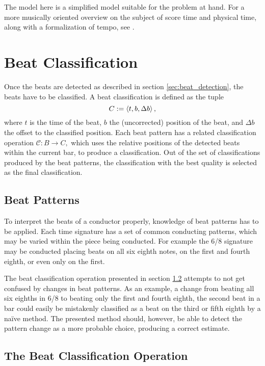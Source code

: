The model here is a simplified model
suitable for the problem at hand.
For a more musically oriented overview
on the subject of score time and physical time,
along with a formalization of tempo,
see \cite{Mazzola2011}.


\section{Beat Classification}

Once the beats are detected as described
in section \ref{sec:beat_detection},
the beats have to be classified.
A beat classification is defined as the tuple
\[
C := \left \langle t, b, \Delta b \right \rangle ,
\]
where $t$ is the time of the beat,
$b$ the (uncorrected) position of the beat,
and $\Delta b$ the offset to the classified position.
Each beat pattern has a related
classification operation $ \mathcal{C} : B \rightarrow C, $
which uses the relative positions of the detected beats
within the current bar,
to produce a classification.
Out of the set of classifications produced by the beat patterns,
the classification with the best quality is
selected as the final classification.

\subsection{Beat Patterns}

To interpret the beats of a conductor properly,
knowledge of beat patterns has to be applied.
Each time signature has a set of common conducting patterns,
which may be varied within the piece being conducted.
For example the 6/8 signature may be conducted
placing beats on
all six eighth notes,
on the first and fourth eighth,
or even only on the first.

The beat classification operation presented
in section \ref{sec:beat_classification_op}
attempts to not get confused by changes in beat patterns.
As an example, a change from beating all six eighths in 6/8
to beating only the first and fourth eighth,
the second beat in a bar could easily be mistakenly classified
as a beat on the third or fifth eighth
by a na\"ive method.
The presented method should, however,
be able to detect the pattern change as
a more probable choice,
producing a correct estimate.

\subsection{The Beat Classification Operation}
\label{sec:beat_classification_op}

